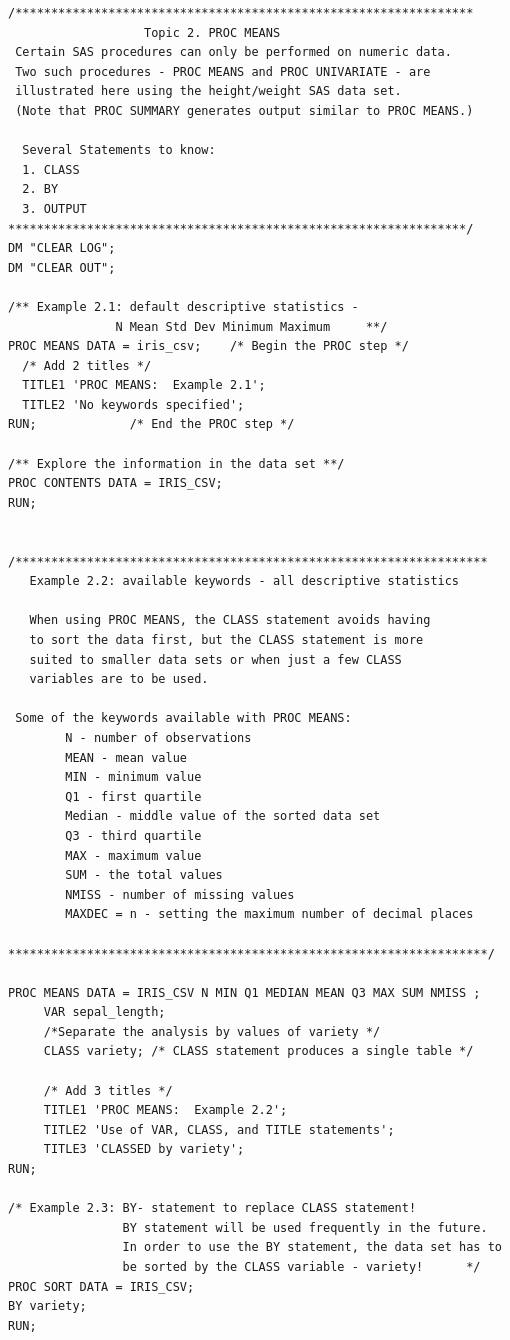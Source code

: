 \documentclass[
]{book}
\begin{document}
\begin{verbatim}
/****************************************************************
                   Topic 2. PROC MEANS
 Certain SAS procedures can only be performed on numeric data. 
 Two such procedures - PROC MEANS and PROC UNIVARIATE - are 
 illustrated here using the height/weight SAS data set. 
 (Note that PROC SUMMARY generates output similar to PROC MEANS.)

  Several Statements to know:
  1. CLASS
  2. BY
  3. OUTPUT
****************************************************************/
DM "CLEAR LOG";
DM "CLEAR OUT";

/** Example 2.1: default descriptive statistics -  
               N Mean Std Dev Minimum Maximum     **/
PROC MEANS DATA = iris_csv;    /* Begin the PROC step */
  /* Add 2 titles */
  TITLE1 'PROC MEANS:  Example 2.1';
  TITLE2 'No keywords specified';
RUN;             /* End the PROC step */

/** Explore the information in the data set **/
PROC CONTENTS DATA = IRIS_CSV;
RUN;


/******************************************************************
   Example 2.2: available keywords - all descriptive statistics 

   When using PROC MEANS, the CLASS statement avoids having
   to sort the data first, but the CLASS statement is more 
   suited to smaller data sets or when just a few CLASS 
   variables are to be used.                    
 
 Some of the keywords available with PROC MEANS:
        N - number of observations
        MEAN - mean value
        MIN - minimum value
        Q1 - first quartile
        Median - middle value of the sorted data set
        Q3 - third quartile
        MAX - maximum value
        SUM - the total values
        NMISS - number of missing values
        MAXDEC = n - setting the maximum number of decimal places 

*******************************************************************/

PROC MEANS DATA = IRIS_CSV N MIN Q1 MEDIAN MEAN Q3 MAX SUM NMISS ; 
     VAR sepal_length;
     /*Separate the analysis by values of variety */
     CLASS variety; /* CLASS statement produces a single table */

     /* Add 3 titles */
     TITLE1 'PROC MEANS:  Example 2.2';
     TITLE2 'Use of VAR, CLASS, and TITLE statements';
     TITLE3 'CLASSED by variety';
RUN;        

/* Example 2.3: BY- statement to replace CLASS statement!
                BY statement will be used frequently in the future.
                In order to use the BY statement, the data set has to
                be sorted by the CLASS variable - variety!      */
PROC SORT DATA = IRIS_CSV; 
BY variety;
RUN;


\end{verbatim}
\end{document}
